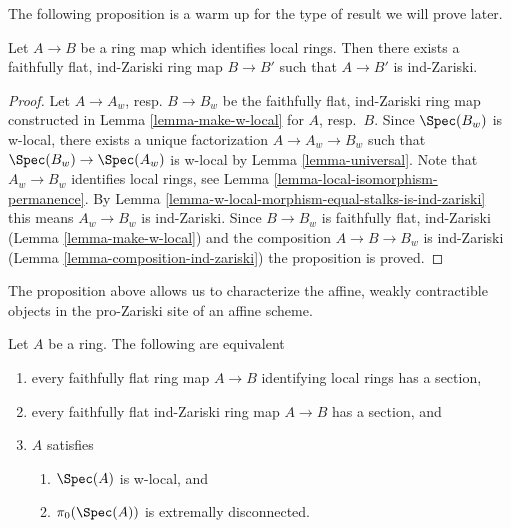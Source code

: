 \noindent
The following proposition is a warm up for the type of result
we will prove later.

\begin{proposition}
\label{proposition-maps-wich-identify-local-rings}
Let $A \to B$ be a ring map which identifies local rings.
Then there exists a faithfully flat, ind-Zariski ring map
$B \to B'$ such that $A \to B'$ is ind-Zariski.
\end{proposition}

\begin{proof}
Let $A \to A_w$, resp. $B \to B_w$ be the faithfully flat, ind-Zariski ring
map constructed in Lemma \ref{lemma-make-w-local} for $A$, resp.\ $B$.
Since $\Spec(B_w)$ is w-local, there exists a unique factorization
$A \to A_w \to B_w$ such that $\Spec(B_w) \to \Spec(A_w)$ is w-local
by Lemma \ref{lemma-universal}. Note that $A_w \to B_w$ identifies
local rings, see
Lemma \ref{lemma-local-isomorphism-permanence}.
By Lemma \ref{lemma-w-local-morphism-equal-stalks-is-ind-zariski}
this means $A_w \to B_w$ is ind-Zariski. Since $B \to B_w$ is
faithfully flat, ind-Zariski (Lemma \ref{lemma-make-w-local})
and the composition $A \to B \to B_w$ is ind-Zariski
(Lemma \ref{lemma-composition-ind-zariski})
the proposition is proved.
\end{proof}

\noindent
The proposition above allows us to characterize the affine, weakly contractible
objects in the pro-Zariski site of an affine scheme.

\begin{lemma}
\label{lemma-w-local-extremally-disconnected}
Let $A$ be a ring. The following are equivalent
\begin{enumerate}
\item every faithfully flat ring map $A \to B$ identifying local rings
has a section,
\item every faithfully flat ind-Zariski ring map $A \to B$ has a section, and
\item $A$ satisfies
\begin{enumerate}
\item $\Spec(A)$ is w-local, and
\item $\pi_0(\Spec(A))$ is extremally disconnected.
\end{enumerate}
\end{enumerate}
\end{lemma}

